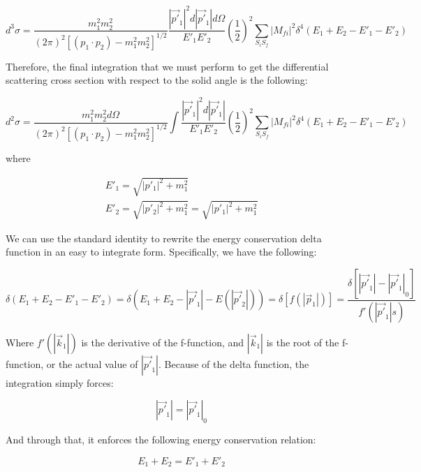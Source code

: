 \documentclass[a4]{article}
\begin{document}
    \begin{equation}
        d^3 \sigma = \frac{m_1^2 m_2^2}{(2 \pi)^2 [(p_1 \cdot p_2) - m_1^2 m_2^2]^{1/2}} \frac{|\vec{p'}_1|^2 d |\vec{p'}_1| d \Omega}{E'_1 E'_2} (\frac{1}{2})^2 \sum_{S_i S_f} |M_{fi}|^2 \delta^4 (E_{1} + E_{2} - E'_{1} - E'_{2})
    \end{equation}

    Therefore, the final integration that we must perform to get the differential scattering cross section with respect to the solid angle is the following:

    \begin{equation}
        d^2 \sigma = \frac{m_1^2 m_2^2 d \Omega}{(2 \pi)^2 [(p_1 \cdot p_2) - m_1^2 m_2^2]^{1/2}} \int \frac{|\vec{p'}_1|^2 d |\vec{p'}_1|}{E'_1 E'_2} (\frac{1}{2})^2 \sum_{S_i S_f} |M_{fi}|^2 \delta^4 (E_{1} + E_{2} - E'_{1} - E'_{2})
    \end{equation}

    where

    \begin{eqnarray}
        E'_1 = \sqrt{|p'_1|^2 + m_1^2} \\
        E'_2 = \sqrt{|p'_2|^2 + m_1^2} = \sqrt{|p'_1|^2 + m_1^2}
    \end{eqnarray}

    We can use the standard identity to rewrite the energy conservation delta function in an easy to integrate form. Specifically, we have the following: 

    \begin{equation}
        \delta (E_1 + E_2 - E'_1 - E'_2) = \delta (E_1 + E_2 - |\vec{p'}_1| - E (|\vec{p'}_2|) ) = \delta [f (|\vec{p}_1|)] = \frac{\delta [|\vec{p'}_1| - |\vec{p'}_1|_0]}{f' (|\vec{p'}_1|s)}
    \end{equation}

    Where $f'(|\vec{k}_1|)$ is the derivative of the f-function, and $|\vec{k}_1|$ is the root of the f-function, or the actual value of $|\vec{p'}_1|$. Because of the delta function, the integration simply forces:

    \begin{equation}
        |\vec{p'}_1| = |\vec{p'}_1|_0
    \end{equation}

    And through that, it enforces the following energy conservation relation:

    \begin{equation}
        E_1 + E_2 = E'_1 + E'_2
    \end{equation}
\end{document}
